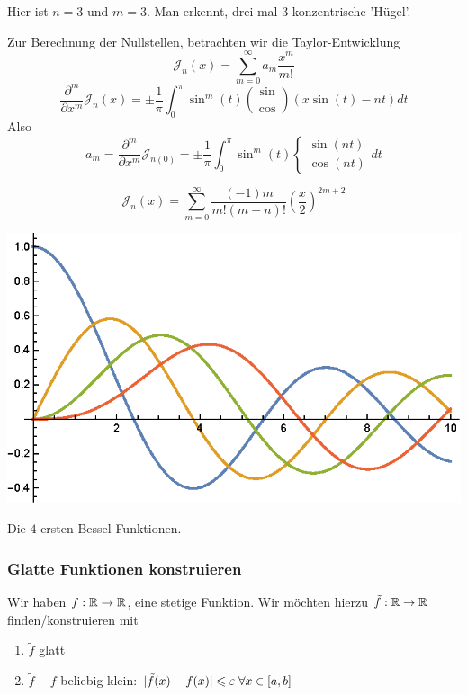 \documentclass[main.tex]{subfiles}
\begin{document}
\begin{Beispiel}
\begin{center}
    Hier ist $n = 3$ und $m = 3$. Man erkennt, drei mal 3 konzentrische 'Hügel'.
  \end{center}

  Zur Berechnung der Nullstellen, betrachten wir die Taylor-Entwicklung
  $$\mathcal{J}_n(x) = \sum \limits_{m = 0}^\infty a_m \dfrac{x^m}{m!}$$
  $$\dfrac{\partial^m}{\partial x^m} \mathcal{J}_n(x) = \pm \dfrac{1}{\pi} \int_0^\pi \sin^m(t) {\sin \choose \cos} ( x \sin(t) - nt) dt$$
  Also
  $$a_m = \dfrac{\partial^m}{\partial x^m} \mathcal{J}_{n(0)} = \pm \dfrac{1}{\pi} \int_0^\pi \sin^m(t) \left\{ \begin{array}{c}\sin(nt) \\ \cos(nt) \end{array}\right. dt$$

  $$\mathcal{J}_n(x) = \sum \limits_{m = 0}^\infty \dfrac{(-1)m}{m!(m+n)!} \left(\dfrac{x}{2}\right)^{2m +2}$$

  \begin{center}
    \includegraphics{./img/bessel}

    Die $4$ ersten Bessel-Funktionen.
  \end{center}
\end{Beispiel}

\subsubsection{Glatte Funktionen konstruieren}

\begin{Beispiel}[Grundproblem]
  Wir haben $f : \mathbb{R} \to \mathbb{R}$, eine stetige Funktion. Wir möchten hierzu $\tilde{f} : \mathbb{R} \to \mathbb{R}$ finden/konstruieren mit
  \begin{enumerate}
    \item $\tilde{f}$ glatt
    \item $\tilde{f} - f$ beliebig klein: $|\tilde{f}(x) - f(x)| \leqslant \varepsilon \;\forall x\in[a,b]$
  \end{enumerate}
\end{Beispiel}
\end{document}
